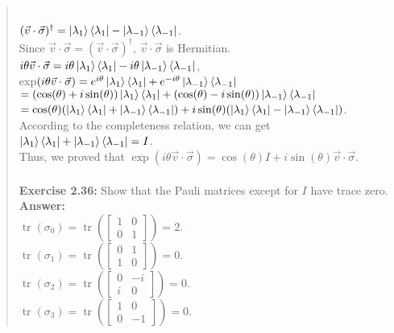 \documentclass[UTF8]{ctexart}
\begin{document}
\begin{quote}
	 \\
	$(\vec{v} \cdot \vec{\sigma})^{\dagger}=\ket{\lambda_{1}}\bra{\lambda_{1}}-\ket{\lambda_{-1}}\bra{\lambda_{-1}}$.
	\\
	Since $\vec{v} \cdot \vec{\sigma}=(\vec{v} \cdot \vec{\sigma})^{\dagger}$, 
	 $\vec{v} \cdot \vec{\sigma}$ is Hermitian. \\
	$i\theta \vec{v} \cdot \vec{\sigma}
	=i\theta \ket{\lambda_{1}}\bra{\lambda_{1}}-i\theta \ket{\lambda_{-1}}\bra{\lambda_{-1}}$,
	\\
	exp$(i\theta \vec{v} \cdot \vec{\sigma})=e^{i\theta} \ket{\lambda_{1}}\bra{\lambda_{1}}+e^{-i\theta} \ket{\lambda_{-1}}\bra{\lambda_{-1}}$\\
	$=(\cos (\theta) +i\sin(\theta))\ket{\lambda_{1}}\bra{\lambda_{1}}+(\cos (\theta) -i\sin(\theta)) \ket{\lambda_{-1}}\bra{\lambda_{-1}}$
	\\
	$=\cos(\theta)(\ket{\lambda_{1}}\bra{\lambda_{1}}+\ket{\lambda_{-1}}\bra{\lambda_{-1}})+i\sin(\theta)(\ket{\lambda_{1}}\bra{\lambda_{1}}-\ket{\lambda_{-1}}\bra{\lambda_{-1}})$.
	\\
	According to the completeness relation, we can get $\ket{\lambda_{1}}\bra{\lambda_{1}}+\ket{\lambda_{-1}}\bra{\lambda_{-1}}=I$.
	\\
	Thus, we proved that $\exp (i \theta \vec{v} \cdot \vec{\sigma})=\cos (\theta) I+i \sin (\theta) \vec{v} \cdot \vec{\sigma}$.
	\\ \\
\textbf{Exercise 2.36:} Show that the Pauli matrices except for $I$ have trace zero. \\
\textbf{Answer:}\\
$\operatorname{tr}\left(\sigma_{0}\right)=\operatorname{tr}(\left[\begin{array}{ll}{1} & {0} \\ {0} & {1}\end{array}\right])=2$. \\
$\operatorname{tr}\left(\sigma_{1}\right)=\operatorname{tr}(\left[\begin{array}{ll}{0} & {1} \\ {1} & {0}\end{array}\right])=0.$\\
$\operatorname{tr}\left(\sigma_{2}\right)=\operatorname{tr}(\left[\begin{array}{ll}{0} & {-i} \\ {i} & {0}\end{array}\right])=0.$\\
$\operatorname{tr}\left(\sigma_{3}\right)=\operatorname{tr}(\left[\begin{array}{ll}{1} & {0} \\ {0} & {-1}\end{array}\right])=0.$\\

\end{quote}
\end{document}
